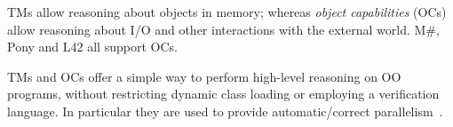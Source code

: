 TMs allow reasoning about objects in memory; whereas
\emph{object capabilities} (OCs) allow reasoning about
I/O and other interactions with the external world.
M\#, Pony and L42 all support OCs.

TMs and OCs offer a simple way to perform high-level reasoning on OO programs, without restricting dynamic class loading or employing a verification language.
In particular they are used to provide automatic/correct parallelism~\cite{GordonEtAl12,clebsch2015deny,clebsch2017orca,?}.













